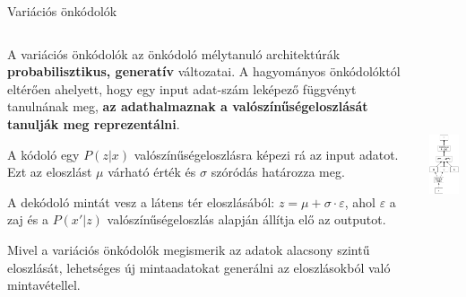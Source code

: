 \documentclass[english, aspectratio=169]{beamer}
\begin{document}
\begin{frame}{Variációs önkódolók}
\begin{columns}
\begin{column}{.7\textwidth}
A variációs önkódolók az önkódoló mélytanuló architektúrák \textbf{probabilisztikus, generatív} változatai. A hagyományos önkódolóktól eltérően ahelyett, hogy egy input adat-szám leképező függvényt tanulnának meg, \textbf{az adathalmaznak a valószínűségeloszlását tanulják meg reprezentálni}.\par\smallskip
A kódoló egy $P(z|x)$ valószínűségeloszlásra képezi rá az input adatot. Ezt az eloszlást $\mu$ várható érték és $\sigma$ szóródás határozza meg.\par\smallskip
A dekódoló mintát vesz a látens tér eloszlásából: $z = \mu + \sigma \cdot \varepsilon$, ahol $\varepsilon$ a zaj és a $P(x'|z)$ valószínűségeloszlás alapján állítja elő az outputot.\par\smallskip
Mivel a variációs önkódolók megismerik az adatok alacsony szintű eloszlását, lehetséges új mintaadatokat generálni az eloszlásokból való mintavétellel. 
\end{column}
\begin{column}{.3\textwidth}
\begin{center}
\includegraphics[height=7cm, keepaspectratio]{graphs/dl_6.png}
\end{center}
\end{column}
\end{columns}
\end{frame}
\end{document}
